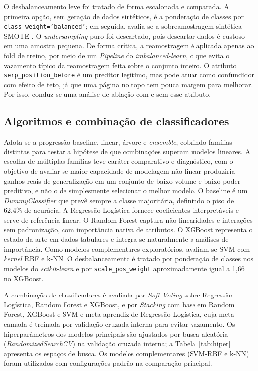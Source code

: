 \documentclass[12pt]{article}
\begin{document}
O desbalanceamento leve foi tratado de forma escalonada e comparada. A primeira opção, sem geração
de dados sintéticos, é a ponderação de classes por \texttt{class\_weight='balanced'}; em seguida,
avalia-se a sobreamostragem sintética SMOTE \cite{chawla2002}. O \textit{undersampling} puro foi
descartado, pois descartar dados é custoso em uma amostra pequena. De forma crítica, a reamostragem
é aplicada apenas ao fold de treino, por meio de um \textit{Pipeline} do \textit{imbalanced-learn},
o que evita o vazamento típico da reamostragem feita sobre o conjunto inteiro. O atributo
\texttt{serp\_position\_before} é um preditor legítimo, mas pode atuar como confundidor com efeito
de teto, já que uma página no topo tem pouca margem para melhorar. Por isso, conduz-se uma análise
de ablação com e sem esse atributo.

\subsection{Algoritmos e combinação de classificadores}

Adota-se a progressão baseline, linear, árvore e \textit{ensemble}, cobrindo famílias distintas
para testar a hipótese de que combinações superam modelos lineares. A escolha de múltiplas
famílias teve caráter comparativo e diagnóstico, com o objetivo de avaliar se maior capacidade de
modelagem não linear produziria ganhos reais de generalização em um conjunto de baixo volume e
baixo poder preditivo, e não o de simplesmente selecionar o melhor modelo. O baseline é um
\textit{DummyClassifier} que prevê sempre a classe majoritária, definindo o piso de 62,4\% de
acurácia. A Regressão Logística fornece coeficientes interpretáveis e serve de referência linear.
O Random Forest \cite{breiman2001} captura não linearidades e interações sem padronização, com
importância nativa de atributos. O XGBoost \cite{chen2016} representa o estado da arte em dados
tabulares e integra-se naturalmente a análises de importância. Como modelos complementares
exploratórios, avaliam-se SVM com \textit{kernel} RBF e k-NN. O desbalanceamento é tratado por
ponderação de classes nos modelos do \textit{scikit-learn} e por \texttt{scale\_pos\_weight}
aproximadamente igual a 1,66 no XGBoost.

A combinação de classificadores é avaliada por \textit{Soft Voting} sobre Regressão Logística,
Random Forest e XGBoost, e por \textit{Stacking} com base em Random Forest, XGBoost e SVM e
meta-aprendiz de Regressão Logística, cuja meta-camada é treinada por validação cruzada interna
para evitar vazamento. Os hiperparâmetros dos modelos principais são ajustados por busca aleatória
(\textit{RandomizedSearchCV}) na validação cruzada interna; a Tabela~\ref{tab:hiper} apresenta os
espaços de busca. Os modelos complementares (SVM-RBF e k-NN) foram utilizados com configurações
padrão na comparação principal.
\end{document}
